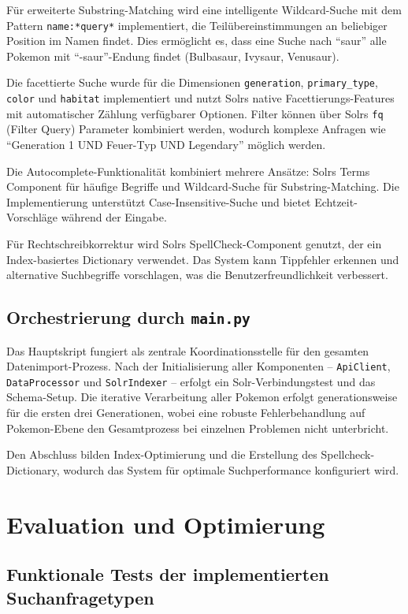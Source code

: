 Für erweiterte Substring-Matching wird eine intelligente Wildcard-Suche mit dem Pattern \texttt{name:*query*} implementiert, die Teilübereinstimmungen an beliebiger Position im Namen findet. Dies ermöglicht es, dass eine Suche nach "`saur"' alle Pokemon mit "`-saur"'-Endung findet (Bulbasaur, Ivysaur, Venusaur).

Die facettierte Suche wurde für die Dimensionen \texttt{generation}, \texttt{primary\_type}, \texttt{color} und \texttt{habitat} implementiert und nutzt Solrs native Facettierungs-Features mit automatischer Zählung verfügbarer Optionen. Filter können über Solrs \texttt{fq} (Filter Query) Parameter kombiniert werden, wodurch komplexe Anfragen wie "`Generation 1 UND Feuer-Typ UND Legendary"' möglich werden.

Die Autocomplete-Funktionalität kombiniert mehrere Ansätze: Solrs Terms Component für häufige Begriffe und Wildcard-Suche für Substring-Matching. Die Implementierung unterstützt Case-Insensitive-Suche und bietet Echtzeit-Vorschläge während der Eingabe.

Für Rechtschreibkorrektur wird Solrs SpellCheck-Component genutzt, der ein Index-basiertes Dictionary verwendet. Das System kann Tippfehler erkennen und alternative Suchbegriffe vorschlagen, was die Benutzerfreundlichkeit verbessert.

\subsection{Orchestrierung durch \texttt{main.py}}

Das Hauptskript fungiert als zentrale Koordinationsstelle für den gesamten Datenimport-Prozess. Nach der Initialisierung aller Komponenten -- \texttt{ApiClient}, \texttt{DataProcessor} und \texttt{SolrIndexer} -- erfolgt ein Solr-Verbindungstest und das Schema-Setup. Die iterative Verarbeitung aller Pokemon erfolgt generationsweise für die ersten drei Generationen, wobei eine robuste Fehlerbehandlung auf Pokemon-Ebene den Gesamtprozess bei einzelnen Problemen nicht unterbricht.

Den Abschluss bilden Index-Optimierung und die Erstellung des Spellcheck-Dictionary, wodurch das System für optimale Suchperformance konfiguriert wird.

\section{Evaluation und Optimierung}

\subsection{Funktionale Tests der implementierten Suchanfragetypen}

